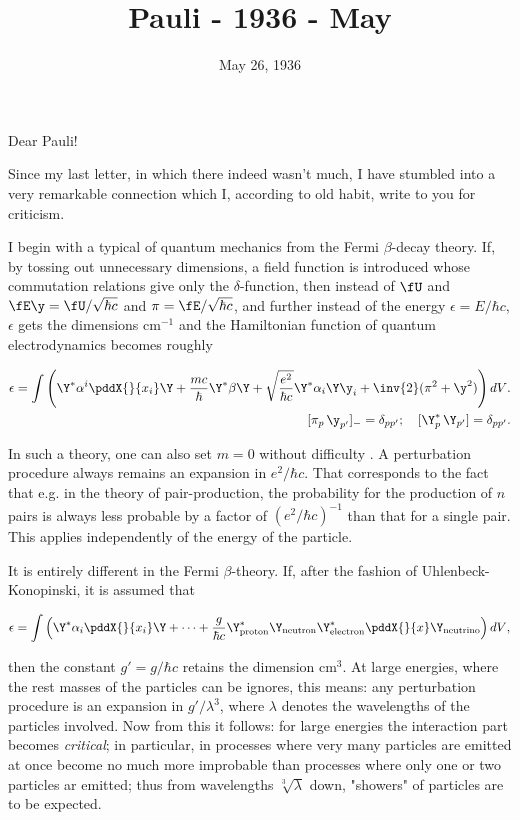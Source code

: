 \documentclass{article}
\title{Pauli - 1936 - May}
\newcommand{\uequ}[1]{
\begin{align*}
#1
\end{align*}
}
\begin{document}
\date{May 26, 1936}


Dear Pauli!

Since my last letter, in which there indeed wasn't much, I have stumbled into a very remarkable connection which I, according to old habit, write to you for criticism.

I begin with a typical  of quantum mechanics from the Fermi $\beta$-decay theory. If, by tossing out unnecessary dimensions, a field function is introduced whose commutation relations give only the $\delta$-function, then instead of $\fU$ and $\fE\y = \fU/\sqrt{\hbar c}$ and $\pi=\fE/\sqrt{\hbar c}$, and further instead of the energy $\epsilon = E/\hbar c$, $\epsilon$ gets the dimensions $\text{cm}^{-1}$ and the Hamiltonian function of quantum electrodynamics becomes roughly
\uequ{
\epsilon = \int\left(
\Y^* \alpha^i \pddX{}{x_i}\Y + \frac{mc}{\hbar}\Y^*\beta\Y + 
\sqrt{\frac{e^2}{\hbar c}}\Y^* \alpha_i \Y \y_i + \inv{2}(\pi^2 + \y^2)
\right){dV}.\\
[\pi_p\, \y_{p'}]_- = \delta_{pp'}; \quad
[\Y^*_p \, \Y_{p'}] = \delta_{pp'}.
}
In such a theory, one can also set $m=0$ without difficulty . A perturbation procedure always remains an expansion in $e^2/\hbar c$. That corresponds to the fact that e.g. in the theory of pair-production, the probability for the production of $n$ pairs is always less probable by a factor of $(e^2/\hbar c)^{-1}$ than that for a single pair. This applies independently of the energy of the particle.

It is entirely different in the Fermi $\beta$-theory. If, after the fashion of Uhlenbeck-Konopinski, it is assumed that
\uequ{
\epsilon = \int\left(\Y^* \alpha_i \pddX{}{x_i} \Y + \dots + 
\frac{g}{\hbar c}\Y^*_\text{proton}\Y_\text{neutron}\Y^*_\text{electron}\pddX{}{x}\Y_\text{neutrino}
\right){dV},
}
then the constant $g'=g/\hbar c$ retains the dimension $\text{cm}^3$. At large energies, where the rest masses of the particles can be ignores, this means: any perturbation procedure is an expansion in $g'/\lambda^3$, where $\lambda$ denotes the wavelengths of the particles involved. Now from this it follows: for large energies the interaction part becomes \textit{critical}; in particular, in processes where very many particles are emitted at once become no much more improbable than processes where only one or two particles ar emitted; thus from wavelengths $\sqrt[3]{\lambda}$ down, "showers" of particles are to be expected.












\end{document}
